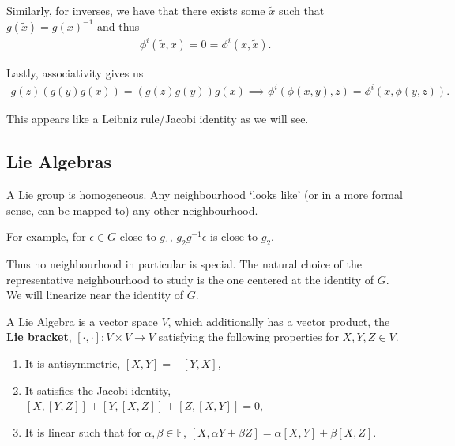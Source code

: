 Similarly, for inverses, we have that there exists some $\widetilde{x}$ such that $g\left( \widetilde{x} \right) = g\left( x \right)^{-1}$ and thus
\begin{align}
    \phi^{i} \left( \widetilde{x},x \right) = 0 = \phi^{i} \left( x, \widetilde{x} \right) 
.\end{align}

Lastly, associativity gives us
\begin{align}
    g\left( z \right) \left( g\left( y \right) g\left( x \right)  \right) = \left( g\left( z \right) g\left( y \right)  \right) g\left( x \right) 
    \implies \phi^{i} \left( \phi \left( x,y \right) ,z \right) = \phi^{i} \left( x,\phi \left( y,z \right)  \right) 
.\end{align}

This appears like a Leibniz rule/Jacobi identity as we will see.

\subsection{Lie Algebras}

A Lie group is homogeneous. Any neighbourhood `looks like' (or in a more formal sense, can be mapped to) any other neighbourhood.

For example, for $\epsilon \in G$ close to $g_1$, $g_2 g^{-1} \epsilon$ is close to $g_2$. 

Thus no neighbourhood in particular is special. The natural choice of the representative neighbourhood to study is the one centered at the identity of $G$. We will linearize near the identity of $G$.

\begin{definition} \label{def:lie_algebra}
    A Lie Algebra is a vector space $V$, which additionally has a vector product, the \textbf{Lie bracket}, $\left[ \cdot, \cdot \right] : V \times  V \to V$ satisfying the following properties for $X,Y,Z \in V$.
    \begin{enumerate}[label=\arabic*)]
        \item It is antisymmetric, $ \left[ X, Y \right] = - \left[ Y, X \right] $,
        \item It satisfies the Jacobi identity, $\left[ X, \left[ Y, Z \right]  \right] + \left[ Y, \left[ X, Z \right]  \right] + \left[ Z, \left[ X, Y \right]  \right] = 0 $,
        \item It is linear such that for $\alpha, \beta \in \mathbb{F}$, $\left[ X, \alpha Y + \beta Z \right] = \alpha\left[ X, Y \right] + \beta \left[ X, Z \right]$.
    \end{enumerate}
\end{definition}

